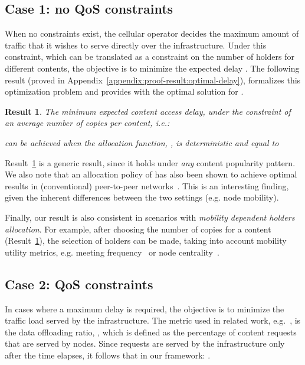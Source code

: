\documentclass[journal]{IEEEtran}
\newtheorem{result}{Result}
\begin{document}
\subsection{Case 1: no QoS constraints}\label{sec:case-study-ETm}
When no  constraints exist, the cellular operator decides the maximum amount of traffic that it wishes to serve directly over the infrastructure. Under this constraint, which can be translated as a constraint on the number of holders for different contents, the objective is to minimize the expected delay . The following result (proved in Appendix~\ref{appendix:proof-result:optimal-delay}), formalizes this optimization problem and provides with the optimal solution for .

\begin{result}\label{result:optimal-delay}
The minimum expected content access delay, under the constraint of an average number of  copies per content, i.e.:

can be achieved when the allocation function, , is deterministic and equal to

\end{result}



Result~\ref{result:optimal-delay} is a generic result, since it holds under \textit{any} content popularity pattern. We also note that an allocation policy of  has also been shown to achieve optimal results in (conventional) peer-to-peer networks~\cite{replication-p2p}. This is an interesting finding, given the inherent differences between the two settings (e.g. node mobility).

Finally, our result is also consistent in scenarios with \textit{mobility dependent holders allocation}. For example, after choosing the number of copies for a content (Result~\ref{result:optimal-delay}), the selection of holders can be made, taking into account mobility utility metrics, e.g. meeting frequency~\cite{contentplace} or node centrality~\cite{Gao-user-centric-DTN}.



\subsection{Case 2: QoS constraints}\label{sec:case-study-Roff}
In cases where a maximum delay  is required, the objective is to minimize the traffic load served by the infrastructure. The metric used in related work, e.g.~\cite{multiple-offloading}, is the data offloading ratio, , which is defined as the percentage of content requests that are served by nodes. Since requests are served by the infrastructure only after the time  elapses, it follows that in our framework: .
\end{document}
